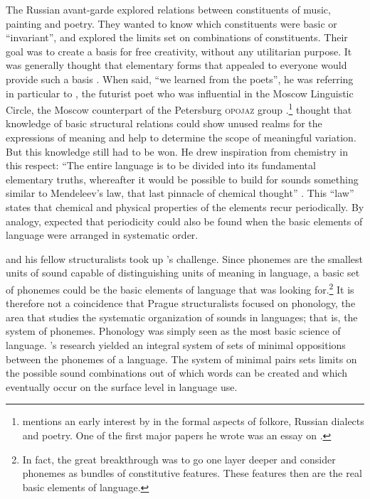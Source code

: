 \documentclass[output=paper]{langscibook}
\begin{document}
The Russian avant-garde explored relations between constituents of music, painting and poetry. They wanted to know which constituents were basic or ``invariant'', and explored the limits set on combinations of constituents. Their goal was to create a basis for free creativity, without any utilitarian purpose. It was generally thought that elementary forms that appealed to everyone would provide such a basis \citep[238--239]{Toman1995}. When {\Jakobson} said, ``we learned from the poets'', he was referring in particular to {\Khlebnikov}, the futurist poet who was influential in the Moscow Linguistic Circle, the Moscow counterpart of the Petersburg \textsc{opojaz} group \citep[see][]{Jakobson1979}.\footnote{ \citet[10--11]{Toman1995} mentions an early interest by {\Jakobson} in the formal aspects of folkore, Russian dialects and poetry. One of the first major papers he wrote was an essay on {\Khlebnikov}.} {\Khlebnikov} thought that know\-ledge of basic structural relations could show unused realms for the expressions of meaning and help to determine the scope of meaningful variation. But this know\-ledge still had to be won. He drew inspiration from chemistry in this respect: ``The entire language is to be divided into its fundamental elementary truths, whereafter it would be possible to build for sounds something similar to Mendeleev's law, that last pinnacle of chemical thought'' \citep[{\Khlebnikov} as translated in][95]{Gasparov2014}. This ``law'' states that chemical and physical properties of the elements recur periodically. By analogy, {\Khlebnikov} expected that periodicity could also be found when the basic elements of language were arranged in systematic order. 

{\Jakobson} and his fellow structuralists took up {\Khlebnikov}'s challenge. Since phonemes are the smallest units of sound capable of distinguishing units of meaning in language, a basic set of phonemes could be the basic elements of language that {\Khlebnikov} was looking for.\footnote{In fact, the great breakthrough was to go one layer deeper and consider phonemes as bundles of constitutive features. These features then are the real basic elements of language.} It is therefore not a coincidence that Prague structuralists focused on phonology, the area that studies the systematic organization of sounds in languages; that is, the system of phonemes. Phonology was simply seen as the most basic science of language. {\Jakobson}'s research yielded an integral system of sets of minimal oppositions between the phonemes of a language. The system of minimal pairs sets limits on the possible sound combinations out of which words can be created and which eventually occur on the surface level in language use. 
\end{document}
